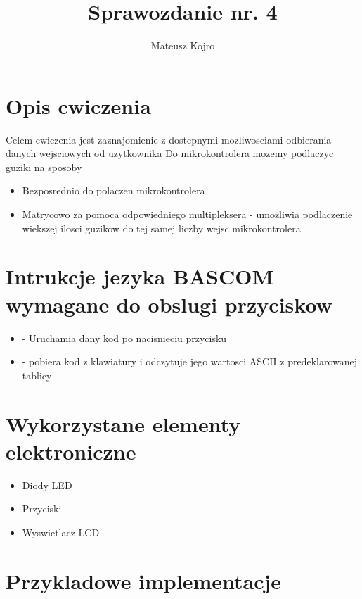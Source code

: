 \documentclass{article}
\title{Sprawozdanie nr. 4}
\author{Mateusz Kojro}
\date{}
\begin{document}
\maketitle

\section{Opis cwiczenia}

Celem cwiczenia jest zaznajomienie z dostepnymi mozliwosciami odbierania danych wejsciowych od uzytkownika
Do mikrokontrolera mozemy podlaczyc guziki na sposoby

\begin{itemize}
  \item Bezposrednio do polaczen mikrokontrolera
  \item Matrycowo za pomoca odpowiedniego multipleksera - umozliwia podlaczenie wiekszej ilosci guzikow do tej samej liczby wejsc mikrokontrolera
\end{itemize}

\section{Intrukcje jezyka BASCOM wymagane do obslugi przyciskow}

\begin{itemize}
  \item {} - Uruchamia dany kod po nacisnieciu przycisku
  \item {} - pobiera kod z klawiatury i odczytuje jego wartosci ASCII z predeklarowanej tablicy 
\end{itemize}

\section{Wykorzystane elementy elektroniczne}

\begin{itemize}
  \item Diody LED
  \item Przyciski
  \item Wyswietlacz LCD
\end{itemize}


\section{Przykladowe implementacje}
\end{document}
